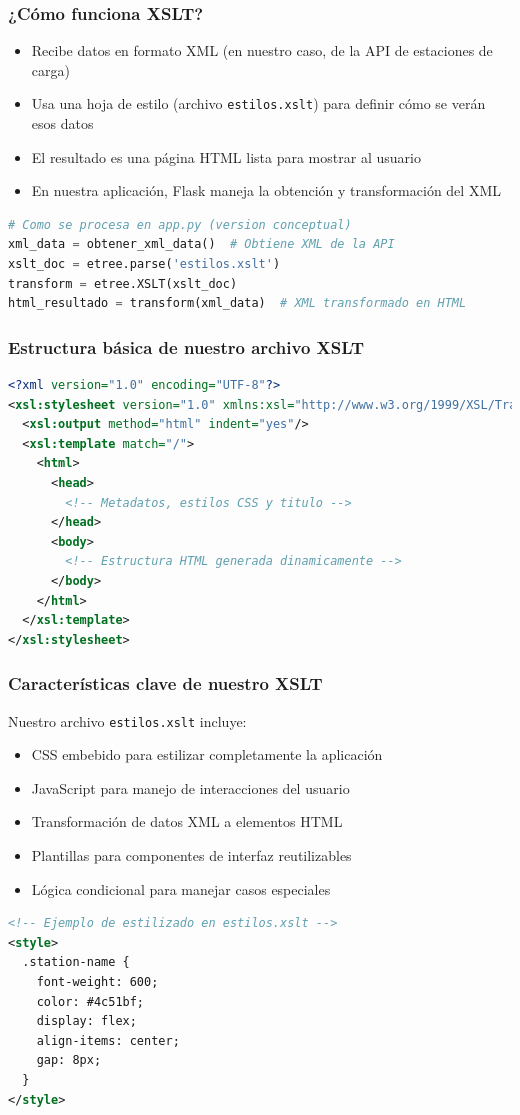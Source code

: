 \documentclass{beamer}
\begin{document}
\begin{frame}[fragile]
\frametitle{¿Cómo funciona XSLT?}
\begin{itemize}
    \item Recibe datos en formato XML (en nuestro caso, de la API de estaciones de carga)
    \item Usa una hoja de estilo (archivo \texttt{estilos.xslt}) para definir cómo se verán esos datos
    \item El resultado es una página HTML lista para mostrar al usuario
    \item En nuestra aplicación, Flask maneja la obtención y transformación del XML
\end{itemize}
\begin{lstlisting}[language=Python]
# Como se procesa en app.py (version conceptual)
xml_data = obtener_xml_data()  # Obtiene XML de la API
xslt_doc = etree.parse('estilos.xslt')
transform = etree.XSLT(xslt_doc)
html_resultado = transform(xml_data)  # XML transformado en HTML
\end{lstlisting}
\end{frame}

\begin{frame}[fragile]
\frametitle{Estructura básica de nuestro archivo XSLT}
\begin{lstlisting}[language=XML]
<?xml version="1.0" encoding="UTF-8"?>
<xsl:stylesheet version="1.0" xmlns:xsl="http://www.w3.org/1999/XSL/Transform">
  <xsl:output method="html" indent="yes"/>
  <xsl:template match="/">
    <html>
      <head>
        <!-- Metadatos, estilos CSS y titulo -->
      </head>
      <body>
        <!-- Estructura HTML generada dinamicamente -->
      </body>
    </html>
  </xsl:template>
</xsl:stylesheet>
\end{lstlisting}
\end{frame}

\begin{frame}[fragile]
\frametitle{Características clave de nuestro XSLT}
Nuestro archivo \texttt{estilos.xslt} incluye:
\begin{itemize}
    \item CSS embebido para estilizar completamente la aplicación
    \item JavaScript para manejo de interacciones del usuario
    \item Transformación de datos XML a elementos HTML
    \item Plantillas para componentes de interfaz reutilizables
    \item Lógica condicional para manejar casos especiales
\end{itemize}
\begin{lstlisting}[language=XML]
<!-- Ejemplo de estilizado en estilos.xslt -->
<style>
  .station-name {
    font-weight: 600;
    color: #4c51bf;
    display: flex;
    align-items: center;
    gap: 8px;
  }
</style>
\end{lstlisting}
\end{frame}
\end{document}
